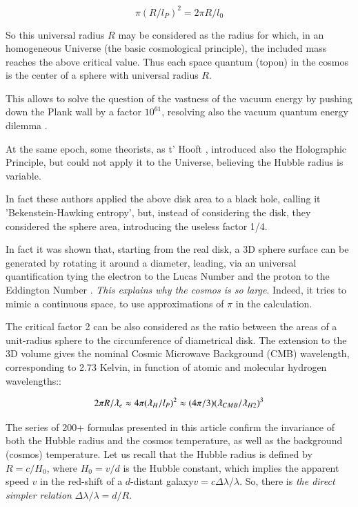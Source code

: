 \documentclass[a4paper,9pt]{article}
\begin{document}
    \begin{equation}
        \pi (R/l_P)^2 = 2\pi R/l_0
    \end{equation}
    
    So this universal radius $R$ may be considered as the radius for which, in an homogeneous Universe (the basic cosmological principle), the included mass reaches the above critical value\cite{Sanchez}. Thus each space quantum (topon) in the cosmos is the center of a sphere with universal radius $R$.  
    
    
    This allows to solve the question of the vastness of the vacuum energy by pushing down the Plank wall by a factor $10^{61}$, resolving also the vacuum quantum energy dilemma  \cite{Sanchez} . 
    
    
    At the same epoch, some theorists, as t' Hooft \cite{Hooft}, introduced also the Holographic Principle, but could not apply it to the Universe, believing the Hubble radius is variable.
    
    
    In fact these authors applied the above disk area to a black hole, calling it 'Bekenstein-Hawking entropy'\cite{Bekenstein}, but, instead of considering the disk, they considered the sphere area, introducing the useless factor 1/4. 
    
    
    In fact it was shown that, starting from the real disk, a 3D sphere surface can be generated by rotating it around a diameter, leading, via an universal quantification tying the electron to the Lucas Number and the proton to the Eddington Number \cite{Sanchez}. \textit {This explains why the cosmos is so large}. Indeed, it tries to mimic a continuous space, to use approximations of $\pi$ in  the calculation.
    
    
    The critical factor 2 can be also considered as the ratio between the areas of a unit-radius sphere to the circumference of diametrical disk. The extension to the 3D volume gives the nominal Cosmic Microwave Background (CMB) wavelength, corresponding to 2.73 Kelvin, in function of atomic and molecular hydrogen wavelengths:\cite{Sanchez}:
    
    \begin{equation}
        2\pi R/\lambdabar_e \approx 4\pi (\lambdabar_H/l_P)^2 \approx (4\pi/3) (\lambdabar_{CMB}/\lambdabar_{H2})^3
    \end{equation}

    The series of 200+ formulas presented in this article confirm the invariance of both the Hubble radius and the cosmos temperature, as well as the background (cosmos) temperature. Let us recall that the Hubble radius is defined by $R = c/H_0$, where $H_0 = v/d$ is the Hubble constant, which implies the apparent speed $v$ in the red-shift of a $d$-distant galaxy$ v = c \Delta \lambda/\lambda$. So, there is \textit {the direct simpler relation} $\Delta \lambda/\lambda =  d/R$. 
    
\end{document}
